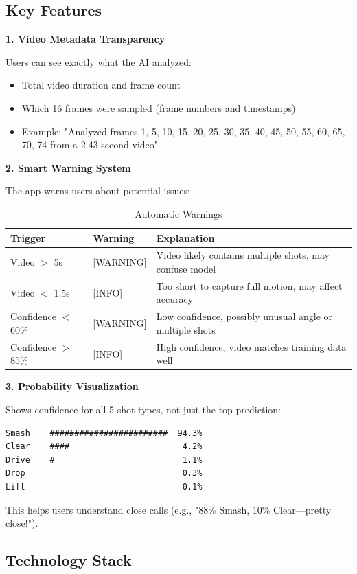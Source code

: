 \documentclass[11pt,a4paper]{article}
\begin{document}
\subsection{Key Features}

\textbf{1. Video Metadata Transparency}

Users can see exactly what the AI analyzed:
\begin{itemize}
\item Total video duration and frame count
\item Which 16 frames were sampled (frame numbers and timestamps)
\item Example: "Analyzed frames 1, 5, 10, 15, 20, 25, 30, 35, 40, 45, 50, 55, 60, 65, 70, 74 from a 2.43-second video"
\end{itemize}

\textbf{2. Smart Warning System}

The app warns users about potential issues:

\begin{table}[H]
\centering
\caption{Automatic Warnings}
\begin{tabular}{llp{6cm}}
\toprule
\textbf{Trigger} & \textbf{Warning} & \textbf{Explanation} \\
\midrule
Video $>$ 5s & [WARNING] & Video likely contains multiple shots, may confuse model \\
Video $<$ 1.5s & [INFO] & Too short to capture full motion, may affect accuracy \\
Confidence $<$ 60\% & [WARNING] & Low confidence, possibly unusual angle or multiple shots \\
Confidence $>$ 85\% & [INFO] & High confidence, video matches training data well \\
\bottomrule
\end{tabular}
\end{table}

\textbf{3. Probability Visualization}

Shows confidence for all 5 shot types, not just the top prediction:
\begin{verbatim}
Smash    ########################  94.3%
Clear    ####                       4.2%
Drive    #                          1.1%
Drop                                0.3%
Lift                                0.1%
\end{verbatim}

This helps users understand close calls (e.g., "88\% Smash, 10\% Clear---pretty close!").

\subsection{Technology Stack}
\end{document}
